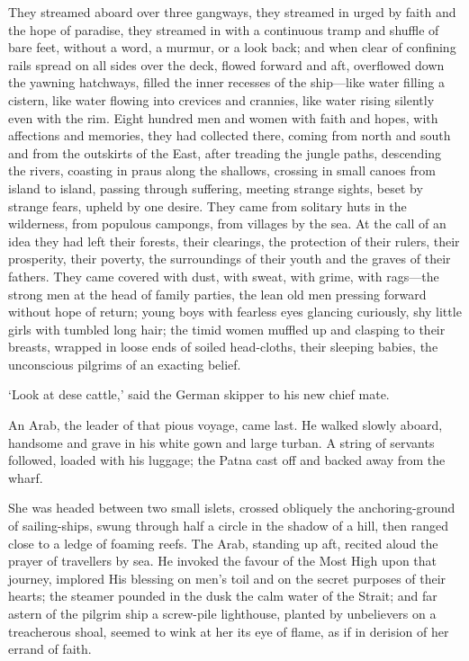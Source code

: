 They streamed aboard over three gangways, they streamed in urged by faith and the hope of paradise, they streamed in with a continuous tramp and shuffle of bare feet, without a word, a murmur, or a look back; and when clear of confining rails spread on all sides over the deck, flowed forward and aft, overflowed down the yawning hatchways, filled the inner recesses of the ship—like water filling a cistern, like water flowing into crevices and crannies, like water rising silently even with the rim. Eight hundred men and women with faith and hopes, with affections and memories, they had collected there, coming from north and south and from the outskirts of the East, after treading the jungle paths, descending the rivers, coasting in praus along the shallows, crossing in small canoes from island to island, passing through suffering, meeting strange sights, beset by strange fears, upheld by one desire. They came from solitary huts in the wilderness, from populous campongs, from villages by the sea. At the call of an idea they had left their forests, their clearings, the protection of their rulers, their prosperity, their poverty, the surroundings of their youth and the graves of their fathers. They came covered with dust, with sweat, with grime, with rags—the strong men at the head of family parties, the lean old men pressing forward without hope of return; young boys with fearless eyes glancing curiously, shy little girls with tumbled long hair; the timid women muffled up and clasping to their breasts, wrapped in loose ends of soiled head-cloths, their sleeping babies, the unconscious pilgrims of an exacting belief.

‘Look at dese cattle,’ said the German skipper to his new chief mate.

An Arab, the leader of that pious voyage, came last. He walked slowly aboard, handsome and grave in his white gown and large turban. A string of servants followed, loaded with his luggage; the Patna cast off and backed away from the wharf.

She was headed between two small islets, crossed obliquely the anchoring-ground of sailing-ships, swung through half a circle in the shadow of a hill, then ranged close to a ledge of foaming reefs. The Arab, standing up aft, recited aloud the prayer of travellers by sea. He invoked the favour of the Most High upon that journey, implored His blessing on men’s toil and on the secret purposes of their hearts; the steamer pounded in the dusk the calm water of the Strait; and far astern of the pilgrim ship a screw-pile lighthouse, planted by unbelievers on a treacherous shoal, seemed to wink at her its eye of flame, as if in derision of her errand of faith.

